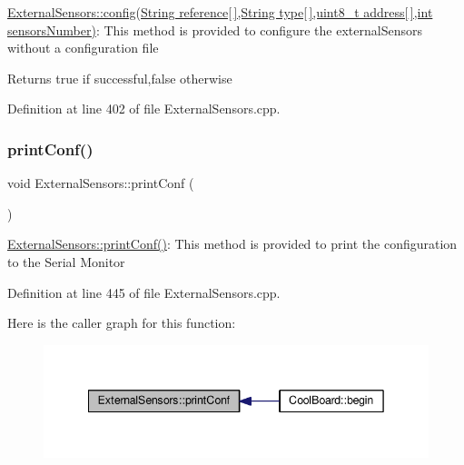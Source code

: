\hyperlink{class_external_sensors_ac829858f587e15a3fcb00567248f0edd}{External\+Sensors\+::config(\+String reference\mbox{[}$\,$\mbox{]},\+String type\mbox{[}$\,$\mbox{]},uint8\+\_\+t address\mbox{[}$\,$\mbox{]},int sensors\+Number)}\+: This method is provided to configure the external\+Sensors without a configuration file

\begin{DoxyReturn}{Returns}
true if successful,false otherwise 
\end{DoxyReturn}


Definition at line 402 of file External\+Sensors.\+cpp.

\mbox{\label{class_external_sensors_a78c2bf55084435dd51d3c559b2d3c6f3}} 
\subsubsection{\texorpdfstring{print\+Conf()}{printConf()}}
{\footnotesize\ttfamily void External\+Sensors\+::print\+Conf (\begin{DoxyParamCaption}{ }\end{DoxyParamCaption})}

\hyperlink{class_external_sensors_a78c2bf55084435dd51d3c559b2d3c6f3}{External\+Sensors\+::print\+Conf()}\+: This method is provided to print the configuration to the Serial Monitor 

Definition at line 445 of file External\+Sensors.\+cpp.

Here is the caller graph for this function\+:
\nopagebreak
\begin{figure}[H]
\begin{center}
\leavevmode
\includegraphics[width=342pt]{class_external_sensors_a78c2bf55084435dd51d3c559b2d3c6f3_icgraph}
\end{center}
\end{figure}
\mbox{\label{class_external_sensors_a53177b81eca3be89508b5511ddcd00fc}} 

